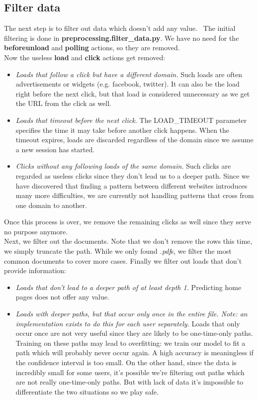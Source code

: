 \subsection{Filter data}\label{subsec:filtering}

The next step is to filter out data which doesn't add any value.~\cite{article:markovmodel, website:redundantsudoku} The initial filtering is done in \textbf{preprocessing.filter\_data.py}. We have no need for the \textbf{beforeunload} and \textbf{polling} actions, so they are removed.
\\[2ex]
Now the useless \textbf{load} and \textbf{click} actions get removed:
\begin{itemize}
	\item \textit{Loads that follow a click but have a different domain.} Such loads are often advertisements or widgets (e.g. facebook, twitter). It can also be the load right before the next click, but that load is considered unnecessary as we get the URL from the click as well.
	\item \textit{Loads that timeout before the next click.} The LOAD\_TIMEOUT parameter specifies the time it may take before another click happens. When the timeout expires, loads are discarded regardless of the domain since we assume a new session has started.
	\item \textit{Clicks without any following loads of the same domain.} Such clicks are regarded as useless clicks since they don't lead us to a deeper path. Since we have discovered that finding a pattern between different websites introduces many more difficulties, we are currently not handling patterns that cross from one domain to another.
\end{itemize}
Once this process is over, we remove the remaining clicks as well since they serve no purpose anymore.
\\[2ex]
Next, we filter out the documents. Note that we don't remove the rows this time, we simply truncate the path. While we only found \textit{.pdf}s, we filter the most common documents to cover more cases. Finally we filter out loads that don't provide information:
\begin{itemize}
	\item \textit{Loads that don't lead to a deeper path of at least depth 1.} Predicting home pages does not offer any value.
	\item \textit{Loads with deeper paths, but that occur only once in the entire file. Note: an implementation exists to do this for each user separately.} Loads that only occur once are not very useful since they are likely to be one-time-only paths. Training on these paths may lead to overfitting: we train our model to fit a path which will probably never occur again. A high accuracy is meaningless if the confidence interval is too small. On the other hand, since the data is incredibly small for some users, it's possible we're filtering out paths which are not really one-time-only paths. But with lack of data it's impossible to differentiate the two situations so we play safe.
\end{itemize}
